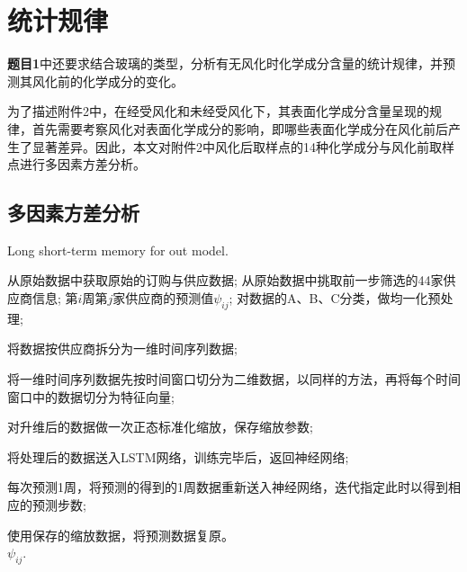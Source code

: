 

\section{统计规律} %
\label{sec:统计规律}

\textbf{题目1}中还要求结合玻璃的类型，分析有无风化时化学成分含量的统计规律，并预测其风化前的化学成分的变化。

为了描述附件2中，在经受风化和未经受风化下，其表面化学成分含量呈现的规律，首先需要考察风化对表面化学成分的影响，即哪些表面化学成分在风化前后产生了显著差异。因此，本文对附件2中风化后取样点的14种化学成分与风化前取样点进行多因素方差分析。

\subsection{多因素方差分析} %
\label{sub:多因素方差分析}

\begin{algorithm}[htb]
  \caption{ Long short-term memory for out model.}
  \label{alg:lstm}
  \begin{algorithmic}[1]
    \Require
      从原始数据中获取原始的订购与供应数据;
      从原始数据中挑取前一步筛选的44家供应商信息;
    \Ensure
      第$i$周第$j$家供应商的预测值$\psi_{i j}$;
    \State 对数据的A、B、C分类，做均一化预处理;

    \State 将数据按供应商拆分为一维时间序列数据;

    \State 将一维时间序列数据先按时间窗口切分为二维数据，以同样的方法，再将每个时间窗口中的数据切分为特征向量;

    \State 对升维后的数据做一次正态标准化缩放，保存缩放参数;

    \State 将处理后的数据送入LSTM网络，训练完毕后，返回神经网络;

    \State 每次预测1周，将预测的得到的1周数据重新送入神经网络，迭代指定此时以得到相应的预测步数;

    \State 使用保存的缩放数据，将预测数据复原。\\
    \Return $\psi_{i j}$.
  \end{algorithmic}
\end{algorithm}


